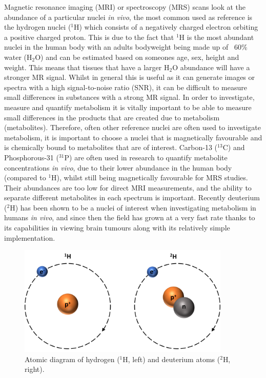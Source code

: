 \documentclass[class=article, crop=false]{standalone}
\begin{document}
 
\label{section:Introduction}

Magnetic resonance imaging (MRI) or spectroscopy (MRS) scans look at the abundance of a particular nuclei \textit{in vivo}, the most common used as reference is the hydrogen nuclei ($^1$H) which consists of a negatively charged electron orbiting a positive charged proton. This is due to the fact that $^1$H is the most abundant nuclei in the human body with an adults bodyweight being made up of ~60\% water (H$_2$O) and can be estimated based on someones age, sex, height and weight\cite{Watson1980TotalMeasurements}. This means that tissues that have a larger H$_2$O abundance will have a stronger MR signal. Whilst in general this is useful as it can generate images or spectra with a high signal-to-noise ratio (SNR), it can be difficult to measure small differences in substances with a strong MR signal. In order to investigate, measure and quantify metabolism it is vitally important to be able to measure small differences in the products that are created due to metabolism (metabolites). Therefore, often other reference nuclei are often used to investigate metabolism, it is important to choose a nuclei that is magnetically favourable and is chemically bound to metabolites that are of interest. Carbon-13 ($^{13}$C)\cite{Grist2019QuantifyingImaging,Brender2019DynamicHyperpolarization} and Phosphorous-31 ($^{31}$P)\cite{Gordon1980LocalizationResonance} are often used in research to quantify metabolite concentrations \textit{in vivo}, due to their lower abundance in the human body (compared to $^1$H), whilst still being magnetically favourable for MRS studies. Their abundances are too low for direct MRI measurements, and the ability to separate different metabolites in each spectrum is important. Recently deuterium ($^2$H) has been shown to be a nuclei of interest when investigating metabolism in humans \textit{in vivo}\cite{Lu2017QuantitativeSpectroscopy,DeFeyter2018DeuteriumVivo}, and since then the field has grown at a very fast rate thanks to its capabilities in viewing brain tumours\cite{DeFeyter2018DeuteriumVivo} along with its relatively simple implementation.

\begin{figure}
    \centering
    \includegraphics[width=0.9\textwidth]{Figures/Intro/1H2H.png}
    \caption{Atomic diagram of hydrogen ($^1$H, left) and deuterium atoms ($^2$H, right).}
    \label{fig:intro:1H2H}
\end{figure}
\end{document}
